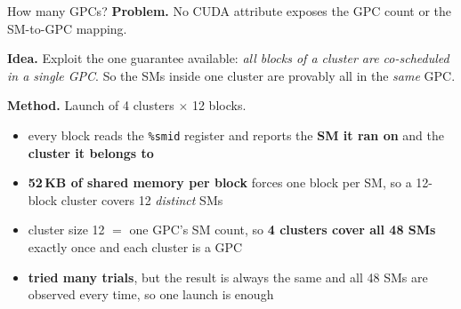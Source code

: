 \documentclass[aspectratio=169, numbering=fraction]{beamer}
\begin{document}
\begin{frame}{How many GPCs?}
  \vspace{0.7em}
  \footnotesize
  \textbf{Problem.} No CUDA attribute exposes the GPC count or the SM-to-GPC mapping.

  \vspace{0.6em}
  \textbf{Idea.} Exploit the one guarantee available: \emph{all blocks of a cluster are
  co-scheduled in a single GPC}. So the SMs inside one cluster are provably all
  in the \emph{same} GPC.

  \vspace{0.6em}
  \textbf{Method.} Launch of 4 clusters $\times$ 12 blocks.
  \begin{itemize}\itemsep3pt
    \item every block reads the \texttt{\%smid} register and reports the \textbf{SM it
          ran on} and the \textbf{cluster it belongs to}
    \item \textbf{52\,KB of shared memory per block} forces one block per SM, so a
          12-block cluster covers 12 \emph{distinct} SMs
    \item cluster size 12 $=$ one GPC's SM count, so \textbf{4 clusters cover all 48 SMs}
          exactly once and each cluster is a GPC
    \item \textbf{tried many trials}, but the result is always the same and all 48 SMs
          are observed every time, so one launch is enough
  \end{itemize}

\end{frame}
\end{document}

